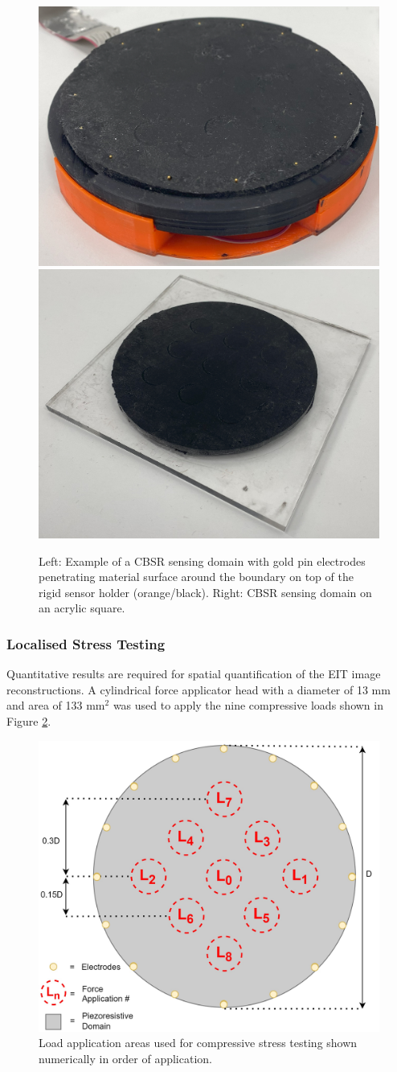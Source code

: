 \begin{figure}[H]
    \centering
    \includegraphics[width=0.3\linewidth]{Figures/CBSR_DUT_w_electrodes_sample.jpg}
    \includegraphics[width=0.3\linewidth]{Figures/CBSR_DUT_sample.jpg}
    \caption{Left: Example of a CBSR sensing domain with gold pin electrodes penetrating material surface around the boundary on top of the rigid sensor holder (orange/black). Right: CBSR sensing domain on an acrylic square.}
    \label{fig:CBSR sample and holder}
\end{figure}

\subsubsection{Localised Stress Testing} \label{sec:Localised Stress Testing}
Quantitative results are required for spatial quantification of the EIT image reconstructions. A cylindrical force applicator head with a diameter of 13 mm and area of 133 mm$^2$ was used to apply the nine compressive loads shown in Figure \ref{fig:force_app_map}.
\begin{figure}[H]
    \centering
    \includegraphics[width=0.6\linewidth]{Figures/EIT_force_app_points_v3.11.jpg}
    \caption{Load application areas used for compressive stress testing shown numerically in order of application.}
    \label{fig:force_app_map}
\end{figure}

